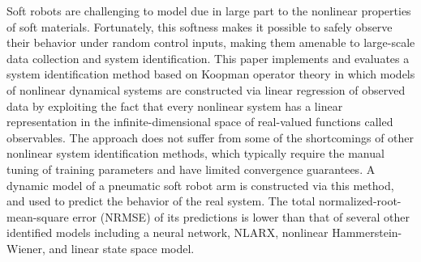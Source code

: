 Soft robots are challenging to model due in large part to the nonlinear properties of soft materials.
Fortunately, this softness makes it possible to safely observe their behavior under random control inputs, making them amenable to large-scale data collection and system identification.
This paper implements and evaluates a system identification method based on Koopman operator theory
in which models of nonlinear dynamical systems are constructed via linear regression of observed data by exploiting the fact that
every nonlinear system has a linear representation in the infinite-dimensional space of real-valued functions called observables.
The approach does not suffer from some of the shortcomings of other nonlinear system identification methods, which typically require the manual tuning of training parameters and have limited convergence guarantees.
A dynamic model of a pneumatic soft robot arm is constructed via this method, and used to predict the behavior of the real system.
The total normalized-root-mean-square error (NRMSE) of its predictions %
is lower than
that of several other identified models including a neural network, NLARX, nonlinear Hammerstein-Wiener, and linear state space model.










